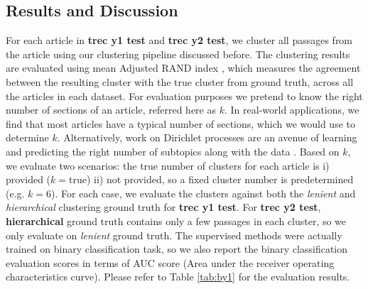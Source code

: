 \subsection{Results and Discussion} For each article in \textbf{trec y1 test} and \textbf{trec y2 test}, we cluster all passages from the article using our clustering pipeline discussed before. The clustering results are evaluated using mean Adjusted RAND index \cite{hubert1985comparing}, which measures the agreement between the resulting cluster with the true cluster from ground truth, across all the articles in each dataset. For evaluation purposes we pretend to know the right number of sections of an article, referred here as $k$. In real-world applications, we find that most articles have a typical number of sections, which we would use to determine $k$. Alternatively, work on Dirichlet processes are an avenue of learning and predicting the right number of subtopics along with the data \cite{griffiths2004hierarchical, blei2011distance}. Based on $k$, we evaluate two scenarios: the true number of clusters for each article is i) provided ($k=$true) ii) not provided, so a fixed cluster number is predetermined (e.g. $k=$6). For each case, we evaluate the clusters against both the \textit{lenient} and \textit{hierarchical} clustering ground truth for \textbf{trec y1 test}. For \textbf{trec y2 test}, \textbf{hierarchical} ground truth contains only a few passages in each cluster, so we only evaluate on \textit{lenient} ground truth. The supervised methods were actually trained on binary classification task, so we also report the binary classification evaluation scores in terms of AUC score (Area under the receiver operating characteristics curve). Please refer to Table \ref{tab:by1} for the evaluation results.

